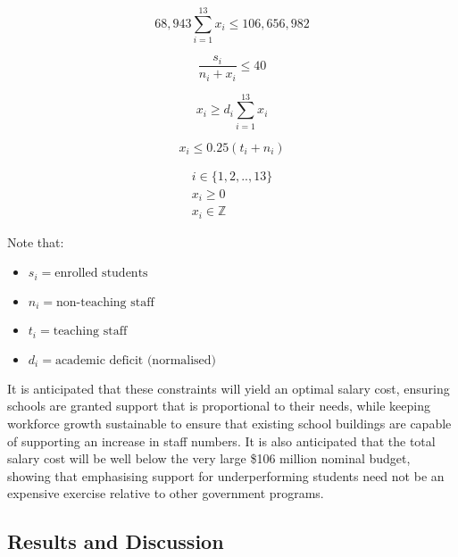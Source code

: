 \documentclass[11pt, a4paper]{article}
\begin{document}
    \begin{equation}
        68,943\sum_{i=1}^{13} x_i \leq 106,656,982
        \label{first_constraint3}
    \end{equation}

    \begin{equation}
        \frac{s_i}{n_i + x_i} \leq 40
    \end{equation}

    \begin{equation}
        x_i \geq d_i\sum_{i=1}^{13} x_i
    \end{equation}

    \begin{equation}
        x_i \leq 0.25(t_i + n_i)
        \label{last_constraint3}
    \end{equation}

    \begin{gather}
        i \in \{1, 2, .., 13\} \\
        x_i \geq 0 \\
        x_i \in \mathbb{Z}            
    \end{gather}

    Note that:

    \begin{itemize}
        \item $s_i = \textrm{enrolled students}$
        \item $n_i = \textrm{non-teaching staff}$
        \item $t_i = \textrm{teaching staff}$
        \item $d_i = \textrm{academic deficit (normalised)}$
    \end{itemize}

    It is anticipated that these constraints will yield an optimal salary cost, ensuring schools are granted support that is proportional to their needs, while keeping workforce growth sustainable to ensure that existing school buildings are capable of supporting an increase in staff numbers. It is also anticipated that the total salary cost will be well below the very large \$106 million nominal budget, showing that emphasising support for underperforming students need not be an expensive exercise relative to other government programs.

    \subsection{Results and Discussion}
\end{document}
